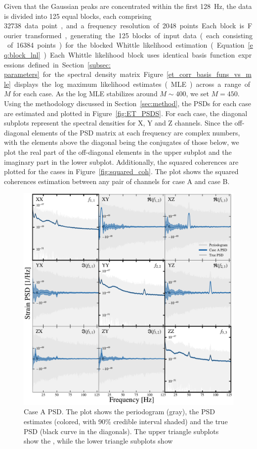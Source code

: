 \documentclass[%
 reprint,
 amsmath,amssymb,
 aps,
 nofootinbib,
]{revtex4-2}
\begin{document}
Given that the Gaussian peaks are concentrated within the first \SI{128}{Hz}, the data is divided into 125 equal blocks, each comprising \SI{32738} data point, and a frequency resolution of 2048 points.
Each block is Fourier transformed, generating the 125 blocks of input data (each consisting of \num{16 384} points) for the blocked Whittle likelihood estimation (Equation~\ref{eq:block_lnl}). 
Each Whittle likelihood block uses identical basis function expressions defined in Section~\ref{subsec: parameters} for the spectral density matrix. 

Figure~\ref{et_corr_basis_funs_vs_mle} displays the log maximum
likelihood estimates (MLE) across a range of $M$ for each case.
As the log MLE stabilizes around $M\sim400$, we set $M=450$.
Using the methodology discussed in Section~\ref{sec:method}, the PSDs for each case are estimated and plotted in Figure~\ref{fig:ET_PSDS}. For each case, the diagonal subplots represent the spectral densities for X, Y and Z channels. Since the off-diagonal elements of the PSD matrix at each frequency are complex numbers, with the elements above the diagonal being the conjugates of those below, we plot the real part of the off-diagonal elements in the upper subplot and the imaginary part in the lower subplot.
Additionally, the squared coherences are plotted for the cases in Figure~\ref{fig:squared_coh}. The plot shows the squared coherences estimation between any pair of channels for case A and case B.


\begin{figure}
\centering
\includegraphics[width=\textwidth]{caseA_psd.pdf}
\caption{Case A PSD. The plot shows the periodogram (gray), the PSD estimates (colored, with 90\% credible interval shaded) and the true PSD (black curve in the diagonals). The upper triangle subplots show the , while the lower triangle subplots show }
\label{fig:caseA_psd}
\end{figure}
\end{document}
